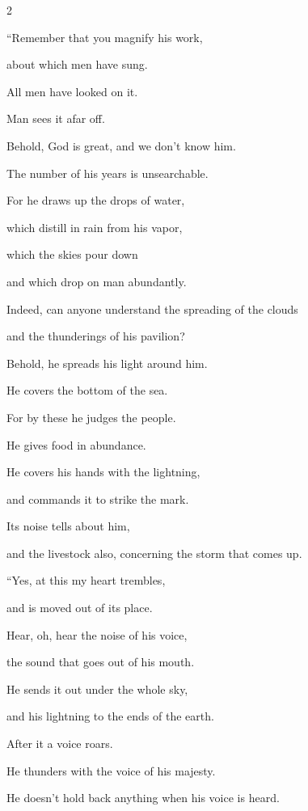 \begin{multicols}{2}
\vspace{\baselineskip}
	
	\myverse{}“Remember that you magnify his work,
	
	about which men have sung.
	
	\myverse{}All men have looked on it.
	
	Man sees it afar off.
	
	\myverse{}Behold, God is great, and we don’t know him.
	
	The number of his years is unsearchable.
	
	\myverse{}For he draws up the drops of water,
	
	which distill in rain from his vapor,
	
	\myverse{}which the skies pour down
	
	and which drop on man abundantly.
	
	\myverse{}Indeed, can anyone understand the spreading of the clouds
	
	and the thunderings of his pavilion?
	
	\myverse{}Behold, he spreads his light around him.
	
	He covers the bottom of the sea.
	
	\myverse{}For by these he judges the people.
	
	He gives food in abundance.
	
	\myverse{}He covers his hands with the lightning,
	
	and commands it to strike the mark.
	
	\myverse{}Its noise tells about him,
	
	and the livestock also, concerning the storm that comes up.
	
	
	
	\mychapter{} \myverse*{}“Yes, at this my heart trembles,
	
	\quad\quad and is moved out of its place.
	
	\myverse{}Hear, oh, hear the noise of his voice,
	
	the sound that goes out of his mouth.
	
	\myverse{}He sends it out under the whole sky,
	
	and his lightning to the ends of the earth.
	
	\myverse{}After it a voice roars.
	
	He thunders with the voice of his majesty.
	
	He doesn’t hold back anything when his voice is heard.
	

\end{multicols}
